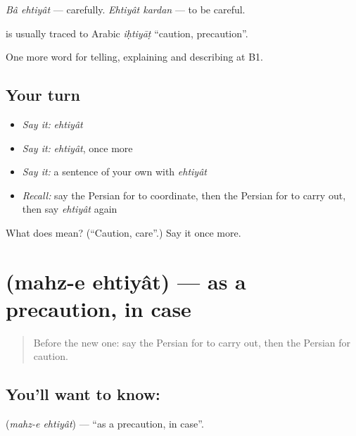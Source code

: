 \emph{Bâ ehtiyât} — carefully. \emph{Ehtiyât kardan} — to be careful.

\begin{cousinweb}
\textbf{} is usually traced to Arabic \emph{iḥtiyāṭ} \textquotedblleft{}caution, precaution\textquotedblright{}.
\end{cousinweb}

\begin{grammarlens}[title={What you've built}]
One more word for telling, explaining and describing at B1.
\end{grammarlens}

\subsection*{Your turn}
\begin{itemize}
\raggedright
  \item \emph{Say it:} \emph{ehtiyât}
  \item \emph{Say it:} \emph{ehtiyât}, once more
  \item \emph{Say it:} a sentence of your own with \emph{ehtiyât}
  \item \emph{Recall:} say the Persian for to coordinate, then the Persian for to carry out, then say \emph{ehtiyât} again
\end{itemize}

\begin{tcolorbox}[breakable,colback=teal!4,colframe=teal!35!black,title={Before you move on}]
What does  mean? (\textquotedblleft{}Caution, care\textquotedblright{}.) Say it once more.
\end{tcolorbox}
\section[\texorpdfstring{\fa{محض} \fa{احتیاط} (mahz-e ehtiyât)}{محض احتیاط (mahz-e ehtiyât)}]{  (mahz-e ehtiyât) — as a precaution, in case}

\label{lesson:FA-C397-mahz-e-ehtiyat}



\begin{quote}
Before the new one: say the Persian for to carry out, then the Persian for caution.
\end{quote}

\subsection*{You'll want to know:  }
\textbf{ } (\emph{mahz-e ehtiyât}) — \textquotedblleft{}as a precaution, in case\textquotedblright{}.

